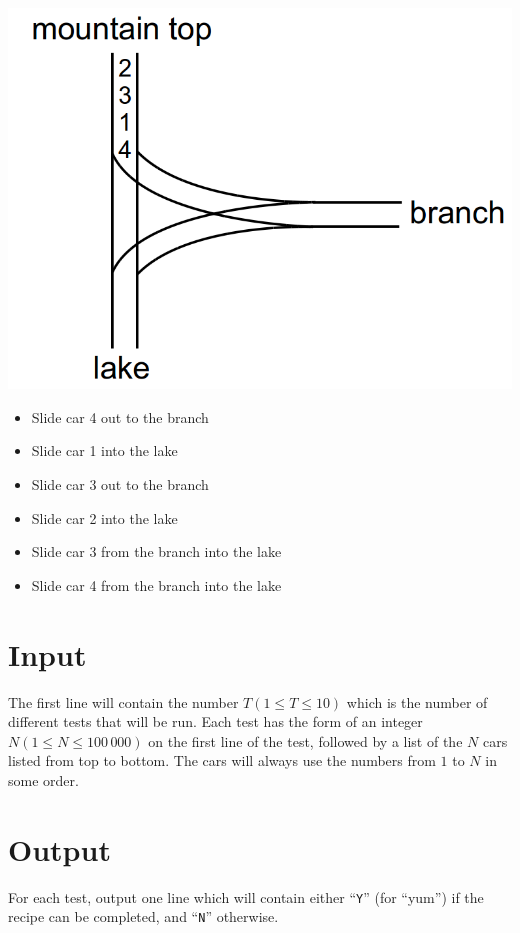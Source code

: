 \begin{minipage}{0.45\linewidth}
  \includegraphics[width=\linewidth]{confection2}
\end{minipage}
\hspace{0.05\linewidth}
\begin{minipage}{0.45\linewidth}
 \begin{itemize}
    \item Slide car 4 out to the branch
    \item Slide car 1 into the lake
    \item Slide car 3 out to the branch
    \item Slide car 2 into the lake
    \item Slide car 3 from the branch into the lake
    \item Slide car 4 from the branch into the lake
  \end{itemize}
\end{minipage}

\section*{Input}
The first line will contain the number $T (1 \leq T \leq 10)$ which is the number of different tests
that will be run. Each test has the form of an integer $N (1 \leq N \leq 100\,000)$ on the first
line of the test, followed by a list of the $N$ cars listed from top to bottom. The cars will always
use the numbers from $1$ to $N$ in some order.

\section*{Output}
For each test, output one line which will contain either ``\verb+Y+'' (for ``yum'') if the recipe can be
completed, and ``\verb+N+'' otherwise.
